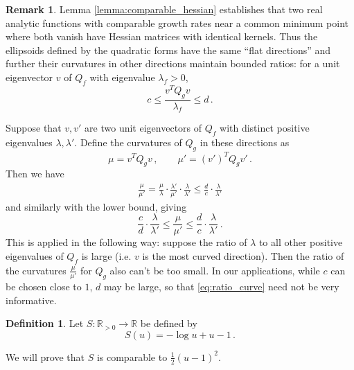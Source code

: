 \documentclass[english,letter paper,12pt,reqno]{article}
\theoremstyle{definition}
\newtheorem{definition}[theorem]{Definition}
\newtheorem{remark}[theorem]{Remark}
\newcommand{\lto}{\longrightarrow}
\newcommand{\bb}[1]{\mathbb{#1}}
\begin{document}
\begin{remark}
Lemma \ref{lemma:comparable_hessian} establishes that two real analytic functions with comparable growth rates near a common minimum point where both vanish have Hessian matrices with identical kernels. Thus the ellipsoids defined by the quadratic forms have the same ``flat directions'' and further their curvatures in other directions maintain bounded ratios: for a unit eigenvector $v$ of $Q_f$ with eigenvalue $\lambda_f > 0$,
\[
c \le \frac{v^T Q_g v}{\lambda_f} \le d \,.
\]
\end{remark}

Suppose that $v, v'$ are two unit eigenvectors of $Q_f$ with distinct positive eigenvalues $\lambda, \lambda'$. Define the curvatures of $Q_g$ in these directions as
\[
\mu = v^T Q_g v\,, \qquad \mu' = (v')^T Q_g v'\,.
\]
Then we have
\begin{align*}
\frac{\mu}{\mu'} = \frac{\mu}{\lambda} \cdot \frac{\lambda'}{\mu'} \cdot \frac{\lambda}{\lambda'} \le \frac{d}{c} \cdot \frac{\lambda}{\lambda'}
\end{align*}
and similarly with the lower bound, giving
\begin{equation}\label{eq:ratio_curve}
\frac{c}{d} \cdot \frac{\lambda}{\lambda'} \le \frac{\mu}{\mu'} \le \frac{d}{c} \cdot \frac{\lambda}{\lambda'}\,.
\end{equation}
This is applied in the following way: suppose the ratio of $\lambda$ to all other positive eigenvalues of $Q_f$ is large (i.e. $v$ is the most curved direction). Then the ratio of the curvatures $\frac{\mu}{\mu'}$ for $Q_g$ also can't be too small. In our applications, while $c$ can be chosen close to $1$, $d$ may be large, so that \eqref{eq:ratio_curve} need not be very informative.

\begin{definition}
    Let $S: \bb{R}_{> 0} \lto \bb{R}$ be defined by
    \[
    S(u) = -\log u + u - 1\,.
    \] 
\end{definition}

We will prove that $S$ is comparable to $\tfrac{1}{2}(u-1)^2$.
\end{document}
